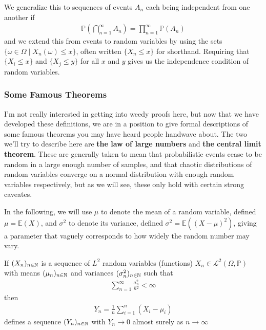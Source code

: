 \documentclass[11pt]{article}
\begin{document}
We generalize this to sequences of events $A_n$ each being independent from one another if \begin{gather*}
\mathbb{P}\left( \bigcap_{n=1}^\infty A_n \right) = \prod_{n=1}^\infty \mathbb{P} (A_n)
\end{gather*}
and we extend this from events to random variables by using the sets $\{\omega \in \Omega \mid X_n(\omega) \le x \}$, often written $\{X_n \le x\}$ for shorthand. Requiring that $\{X_i \le x\}$ and $\{X_j \le y\}$ for all $x$ and $y$ gives us the independence condition of random variables.

\subsubsection{Some Famous Theorems}

I'm not really interested in getting into weedy proofs here, but now that we have developed these definitions, we are in a position to give formal descriptions of some famous theorems you may have heard people handwave about. The two we'll try to describe here are \textbf{the law of large numbers} and \textbf{the central limit theorem}. These are generally taken to mean that probabilistic events cease to be random in a large enough number of samples, and that chaotic distributions of random variables converge on a normal distribution with enough random variables respectively, but as we will see, these only hold with certain strong caveates.

In the following, we will use $\mu$ to denote the mean of a random variable, defined $\mu = \mathbb{E}(X)$, and $\sigma^2$ to denote its variance, defined $\sigma^2 = \mathbb{E}((X - \mu)^2)$, giving a parameter that vaguely corresponds to how widely the random number may vary.

\begin{theorem}
If $(X_n)_{n \in \mathbb{N}}$ is a sequence of $L^2$ random variables (functions) $ X_n \in \mathcal L^2(\Omega, \mathbb{P})$ with means $(\mu_n)_{n\in \mathbb{N}}$ and variances $(\sigma_n^2)_{n \in \mathbb{N}}$ such that \begin{gather*}
\sum_{n=1}^\infty \frac{\sigma_n^2}{n^2} < \infty
\end{gather*}
then \begin{gather*}
Y_n = \frac{1}{n} \sum_{i=1}^n (X_i - \mu_i)
\end{gather*}
defines a sequence $(Y_n)_{n\in \mathbb{N}}$ with $Y_n \to 0$ almost surely as $n \to \infty$
\end{theorem}
\end{document}
